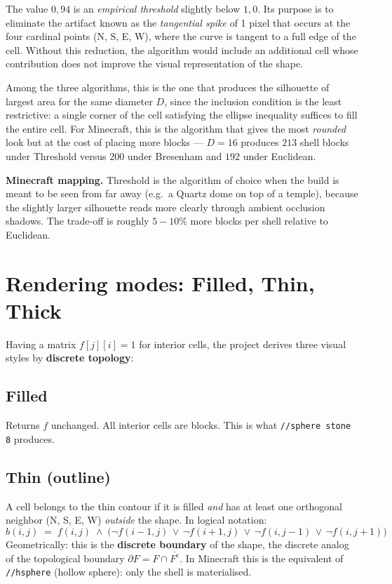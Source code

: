 \documentclass[12pt,a4paper]{scrartcl}
\newcommand{\acc}[1]{\textcolor{accent}{\textbf{#1}}}
\newcommand{\cmd}[1]{\textcolor{earth}{\texttt{\small #1}}}
\begin{document}
The value \acc{$0{,}94$} is an \emph{empirical threshold} slightly below $1{,}0$. Its purpose is to eliminate the artifact known as the \emph{tangential spike} of 1 pixel that occurs at the four cardinal points (N, S, E, W), where the curve is tangent to a full edge of the cell. Without this reduction, the algorithm would include an additional cell whose contribution does not improve the visual representation of the shape.

Among the three algorithms, this is the one that produces the silhouette of largest area for the same diameter $D$, since the inclusion condition is the least restrictive: a single corner of the cell satisfying the ellipse inequality suffices to fill the entire cell. For Minecraft, this is the algorithm that gives the most \emph{rounded} look but at the cost of placing more blocks --- $D=16$ produces $213$ shell blocks under Threshold versus $200$ under Bresenham and $192$ under Euclidean.

\begin{minec}
\textbf{Minecraft mapping.} Threshold is the algorithm of choice when the build is meant to be seen from far away (e.g.\ a Quartz dome on top of a temple), because the slightly larger silhouette reads more clearly through ambient occlusion shadows. The trade-off is roughly $5{-}10\%$ more blocks per shell relative to Euclidean.
\end{minec}

\section{Rendering modes: Filled, Thin, Thick}

Having a matrix $f[j][i] = 1$ for interior cells, the project derives three visual styles by \acc{discrete topology}:

\subsection{Filled}
Returns $f$ unchanged. All interior cells are blocks. This is what \cmd{//sphere stone 8} produces.

\subsection{Thin (outline)}
A cell belongs to the thin contour if it is filled \emph{and} has at least one orthogonal neighbor (N, S, E, W) \emph{outside} the shape. In logical notation:
\[
b(i,j) \;=\; f(i,j) \;\wedge\;
\bigl(\neg f(i{-}1,j)\,\vee\,\neg f(i{+}1,j)\,\vee\,\neg f(i,j{-}1)\,\vee\,\neg f(i,j{+}1)\bigr)
\]
Geometrically: this is the \acc{discrete boundary} of the shape, the discrete analog of the topological boundary $\partial F = F \cap \overline{F^{\mathrm{c}}}$. In Minecraft this is the equivalent of \cmd{//hsphere} (hollow sphere): only the shell is materialised.
\end{document}
